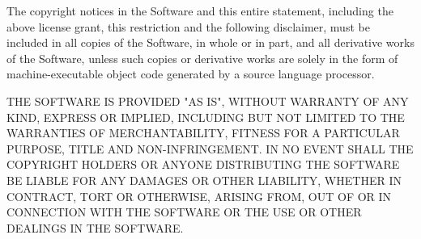 \vparasmall
The copyright notices in the Software and this entire statement, including
the above license grant, this restriction and the following disclaimer,
must be included in all copies of the Software, in whole or in part, and
all derivative works of the Software, unless such copies or derivative
works are solely in the form of machine-executable object code generated by
a source language processor.

\vparasmall
THE SOFTWARE IS PROVIDED "AS IS", WITHOUT WARRANTY OF ANY KIND, EXPRESS OR
IMPLIED, INCLUDING BUT NOT LIMITED TO THE WARRANTIES OF MERCHANTABILITY,
FITNESS FOR A PARTICULAR PURPOSE, TITLE AND NON-INFRINGEMENT. IN NO EVENT
SHALL THE COPYRIGHT HOLDERS OR ANYONE DISTRIBUTING THE SOFTWARE BE LIABLE
FOR ANY DAMAGES OR OTHER LIABILITY, WHETHER IN CONTRACT, TORT OR OTHERWISE,
ARISING FROM, OUT OF OR IN CONNECTION WITH THE SOFTWARE OR THE USE OR OTHER
DEALINGS IN THE SOFTWARE.



%
%
%
%
%
%
%
%
%
%



